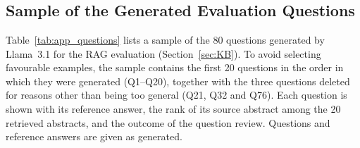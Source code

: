 \documentclass[bdcc,article,submit,pdftex,moreauthors]{Definitions/mdpi}
\begin{document}
\section[\appendixname~\thesection]{}


\subsection[\appendixname~\thesubsection]{Sample of the Generated Evaluation Questions}
\label{app:sub_questions}

Table~\ref{tab:app_questions} lists a sample of the 80 questions generated by Llama~3.1 for the RAG evaluation (Section~\ref{sec:KB}). To avoid selecting favourable examples, the sample contains the first 20 questions in the order in which they were generated (Q1--Q20), together with the three questions deleted for reasons other than being too general (Q21, Q32 and Q76). Each question is shown with its reference answer, the rank of its source abstract among the 20 retrieved abstracts, and the outcome of the question review. Questions and reference answers are given as generated.
\end{document}
